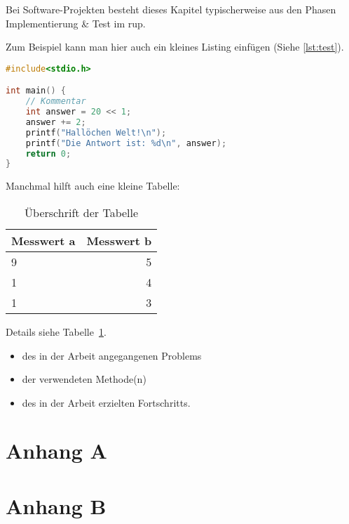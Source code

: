 \documentclass[oneside]{ausarbeitung}
\begin{document}
Bei Software-Projekten besteht dieses Kapitel typischerweise aus den 
Phasen Implementierung \& Test im \ac{rup}.

Zum Beispiel kann man hier auch ein kleines Listing einfügen (Siehe \ref{lst:test}).

\begin{lstlisting}[language=c,%
                   caption={Überschrift des Quelltexts},label=lst:test]
#include<stdio.h>

int main() {
    // Kommentar
    int answer = 20 << 1;
    answer += 2;
    printf("Hallöchen Welt!\n");
    printf("Die Antwort ist: %d\n", answer);
    return 0;
}
\end{lstlisting}

Manchmal hilft auch eine kleine Tabelle:

\begin{table}[htbp]
\centering
\begin{tabular}{|l|r|}
\hline
\textbf{Messwert a} & \textbf{Messwert b} \\ \hline
9 & 5 \\ \hline
1 & 4 \\ \hline
1 & 3 \\ \hline
\end{tabular}
\caption{Überschrift der Tabelle}
\label{tab:my-table}
\end{table}

Details siehe Tabelle~\ref{tab:my-table}.


  \begin{itemize}
    \item des in der Arbeit angegangenen Problems
    \item der verwendeten Methode(n)
    \item des in der Arbeit erzielten Fortschritts.
  \end{itemize}

\appendix

\printbibliography[heading=bibintoc]

\chapter{Anhang A}

\Blindtext

\chapter{Anhang B}

\Blindtext
\end{document}
